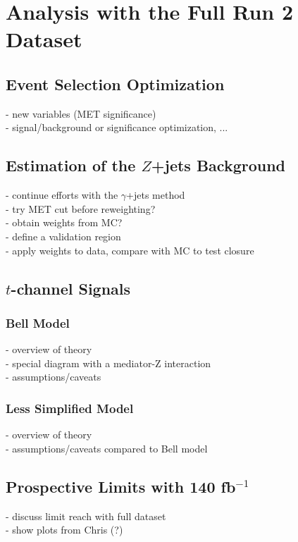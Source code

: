 \chapter{Analysis with the Full Run 2 Dataset}

\section{Event Selection Optimization}
- new variables (MET significance)\\
- signal/background or significance optimization, ...\\

\section{Estimation of the $Z$+jets Background}

- continue efforts with the $\gamma$+jets method\\
- try MET cut before reweighting?\\
- obtain weights from MC?\\
- define a validation region\\
- apply weights to data, compare with MC to test closure\\

\section{$t$-channel Signals}

\subsection{Bell Model}

- overview of theory\\
- special diagram with a mediator-Z interaction\\
- assumptions/caveats\\

\subsection{Less Simplified Model}

- overview of theory\\
- assumptions/caveats compared to Bell model\\

\section{Prospective Limits with 140 fb$^{-1}$}

- discuss limit reach with full dataset\\
- show plots from Chris (?)\\